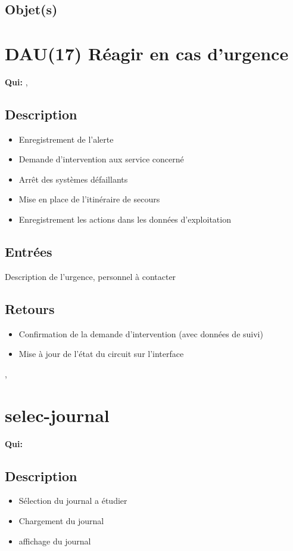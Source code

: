 	\subsection{Objet(s)}
		\allobjs

\section{DAU(17) Réagir en cas d'urgence}
	\textbf{Qui:} \urt, \us

	\subsection{Description}
	\begin{itemize}
		\item Enregistrement de l'alerte
		\item Demande d'intervention aux service concerné
		\item Arrêt des systèmes défaillants
		\item Mise en place de l'itinéraire de secours
		\item Enregistrement les actions dans les données d'exploitation
	\end{itemize}

	\subsection{Entrées}
		Description de l'urgence, personnel à contacter

	\subsection{Retours}
	\begin{itemize}
		\item Confirmation de la demande d'intervention (avec données de suivi)
		\item Mise à jour de l'état du circuit sur l'interface
	\end{itemize}

	\objets
		\event, \logs

\section{selec-journal}
	\textbf{Qui:} \urt

	\subsection{Description}
	\begin{itemize}
		\item Sélection du journal a étudier
		\item Chargement du journal
		\item affichage du journal
	\end{itemize}

